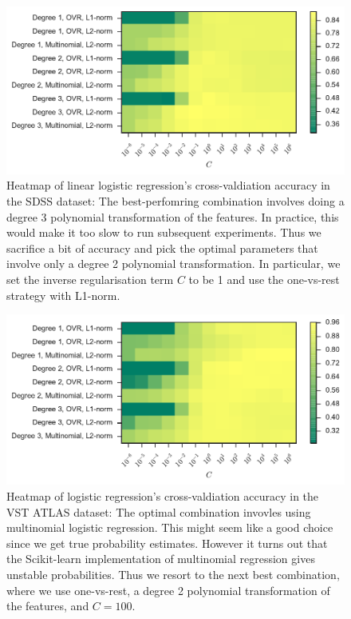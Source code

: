 \begin{figure}[p]
	\centering
	\includegraphics[width=\textwidth]{figures/4_expt1/sdss_grid_logistic}
	\caption[Heatmap of logistic regression's cross-valdiation accuracy in SDSS]{
		Heatmap of linear logistic regression's cross-valdiation accuracy in the SDSS dataset:
		The best-perfomring combination involves doing a degree 3 polynomial transformation
		of the features. In practice, this would make it too slow to run subsequent experiments.
		Thus we sacrifice a bit of accuracy and pick the optimal parameters that
		involve only a degree 2 polynomial transformation. In particular, we set the inverse regularisation
		term $C$ to be 1 and use the one-vs-rest strategy with L1-norm.}
	\label{fig:sdss_grid_logistic}
\end{figure}

\begin{figure}[p]
	\centering
	\includegraphics[width=\textwidth]{figures/4_expt1/vstatlas_grid_logistic}
	\caption[Heatmap of logistic regression's cross-valdiation accuracy in VST ATLAS]{
		Heatmap of logistic regression's cross-valdiation accuracy in the VST ATLAS dataset:
		The optimal combination invovles using multinomial logistic regression. This
		might seem like a good choice since we get true probability estimates. However
		it turns out that the Scikit-learn implementation of multinomial regression
		gives unstable probabilities. Thus we resort to the next best combination,
		where we use one-vs-rest, a degree 2 polynomial transformation of the features, and $C = 100$. }
	\label{fig:vstatlas_grid_logistic}
\end{figure}

